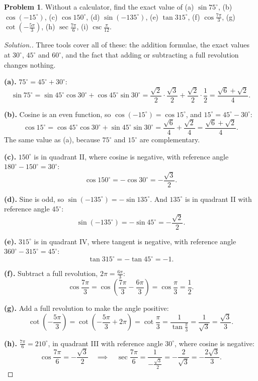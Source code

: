 \documentclass[11pt,a4paper]{article}
\theoremstyle{definition}
\newtheorem{problemx}{Problem}[section]
\newenvironment{problem}{\begin{problemx}}{\end{problemx}}
\newenvironment{solution}
  {\renewcommand{\qedsymbol}{}\begin{proof}[\textit{Solution}.]}
  {\end{proof}}
\begin{document}
\begin{problem}
Without a calculator, find the exact value of
\quad (a) $\sin 75^\circ$, \quad (b) $\cos(-15^\circ)$, \quad (c) $\cos 150^\circ$,
\quad (d) $\sin(-135^\circ)$, \quad (e) $\tan 315^\circ$, \quad
(f) $\cos\frac{7\pi}{3}$, \quad (g) $\cot\left(-\frac{5\pi}{3}\right)$, \quad
(h) $\sec\frac{7\pi}{6}$, \quad (i) $\csc\frac{\pi}{12}$.
\end{problem}

\begin{solution}
Three tools cover all of these: the addition formulae, the exact values at $30^\circ$,
$45^\circ$ and $60^\circ$, and the fact that adding or subtracting a full revolution
changes nothing.

\textbf{(a).} $75^\circ=45^\circ+30^\circ$:
$$\sin 75^\circ=\sin 45^\circ\cos 30^\circ+\cos 45^\circ\sin 30^\circ
=\frac{\sqrt{2}}{2}\cdot\frac{\sqrt{3}}{2}+\frac{\sqrt{2}}{2}\cdot\frac{1}{2}
=\frac{\sqrt{6}+\sqrt{2}}{4}.$$

\textbf{(b).} Cosine is an even function, so $\cos(-15^\circ)=\cos 15^\circ$, and
$15^\circ=45^\circ-30^\circ$:
$$\cos 15^\circ=\cos 45^\circ\cos 30^\circ+\sin 45^\circ\sin 30^\circ
=\frac{\sqrt{6}}{4}+\frac{\sqrt{2}}{4}=\frac{\sqrt{6}+\sqrt{2}}{4}.$$
The same value as (a), because $75^\circ$ and $15^\circ$ are complementary.

\textbf{(c).} $150^\circ$ is in quadrant II, where cosine is negative, with reference
angle $180^\circ-150^\circ=30^\circ$:
$$\cos 150^\circ=-\cos 30^\circ=-\frac{\sqrt{3}}{2}.$$

\textbf{(d).} Sine is odd, so $\sin(-135^\circ)=-\sin 135^\circ$. And $135^\circ$ is in
quadrant II with reference angle $45^\circ$:
$$\sin(-135^\circ)=-\sin 45^\circ=-\frac{\sqrt{2}}{2}.$$

\textbf{(e).} $315^\circ$ is in quadrant IV, where tangent is negative, with reference
angle $360^\circ-315^\circ=45^\circ$:
$$\tan 315^\circ=-\tan 45^\circ=-1.$$

\textbf{(f).} Subtract a full revolution, $2\pi=\frac{6\pi}{3}$:
$$\cos\frac{7\pi}{3}=\cos\left(\frac{7\pi}{3}-\frac{6\pi}{3}\right)=\cos\frac{\pi}{3}
=\frac{1}{2}.$$

\textbf{(g).} Add a full revolution to make the angle positive:
$$\cot\left(-\frac{5\pi}{3}\right)=\cot\left(-\frac{5\pi}{3}+2\pi\right)
=\cot\frac{\pi}{3}=\frac{1}{\tan\frac{\pi}{3}}=\frac{1}{\sqrt{3}}=\frac{\sqrt{3}}{3}.$$

\textbf{(h).} $\frac{7\pi}{6}=210^\circ$, in quadrant III with reference angle
$30^\circ$, where cosine is negative:
$$\cos\frac{7\pi}{6}=-\frac{\sqrt{3}}{2}\quad\implies\quad
\sec\frac{7\pi}{6}=\frac{1}{-\frac{\sqrt{3}}{2}}=-\frac{2}{\sqrt{3}}
=-\frac{2\sqrt{3}}{3}.$$


\end{solution}
\end{document}
